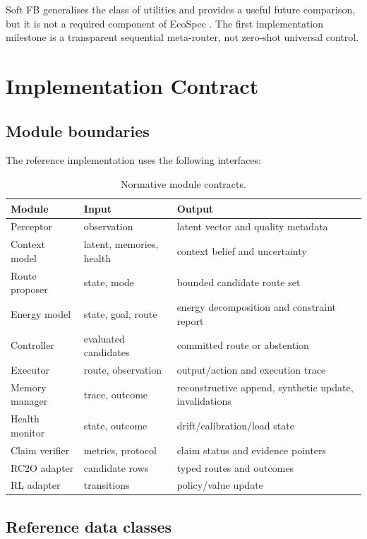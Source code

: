 \documentclass[10pt]{article}
\begin{document}
Soft FB generalises the class of utilities and provides a useful future comparison, but it is not a required component of EcoSpec \citep{bagatella2026softfb}. The first implementation milestone is a transparent sequential meta-router, not zero-shot universal control.

\section{Implementation Contract}

\subsection{Module boundaries}

The reference implementation uses the following interfaces:

\begin{table}[h]
\centering
\caption{Normative module contracts.}
\label{tab:interfaces}
\begin{tabularx}{\textwidth}{lXX}
\toprule
Module & Input & Output \\
\midrule
Perceptor & observation & latent vector and quality metadata \\
Context model & latent, memories, health & context belief and uncertainty \\
Route proposer & state, mode & bounded candidate route set \\
Energy model & state, goal, route & energy decomposition and constraint report \\
Controller & evaluated candidates & committed route or abstention \\
Executor & route, observation & output/action and execution trace \\
Memory manager & trace, outcome & reconstructive append, synthetic update, invalidations \\
Health monitor & state, outcome & drift/calibration/load state \\
Claim verifier & metrics, protocol & claim status and evidence pointers \\
RC2O adapter & candidate rows & typed routes and outcomes \\
RL adapter & transitions & policy/value update \\
\bottomrule
\end{tabularx}
\end{table}

\subsection{Reference data classes}
\end{document}
